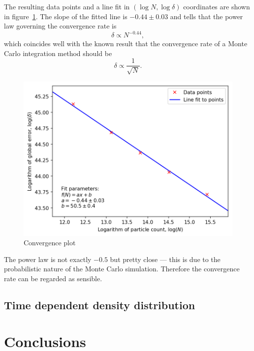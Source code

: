 \documentclass[a4paper,twoside,12pt]{article}
\begin{document}
The resulting data points and a line fit in $(\log N, \log \delta)$ coordinates are shown in figure~\ref{fig:convergence}. The slope of the fitted line is $-0.44 \pm 0.03$ and tells that the power law governing the convergence rate is
\[
    \delta \propto N^{-0.44},
\]
which coincides well with the known result that the convergence rate of a Monte Carlo integration method should be~\cite{kapanen:bsc}
\[
    \delta \propto \frac{1}{\sqrt{N}}.
\]

\begin{figure}[t]
    \centering
    \includegraphics{images/convergence_plot.png}
    \caption{Convergence plot}
    \label{fig:convergence}
\end{figure}

The power law is not exactly $-0.5$ but pretty close --- this is due to the probabilistic nature of the Monte Carlo simulation. Therefore the convergence rate can be regarded as sensible.

\subsection{Time dependent density distribution}

\section{Conclusions}

\clearpage



\end{document}
